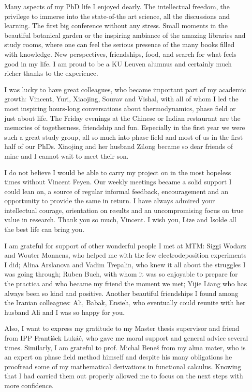 Many aspects of my PhD life I enjoyed dearly. The intellectual freedom, the privilege to immerse into the state-of-the art science, all the discussions and learning. The first big conference without any stress. Small moments in the beautiful botanical garden or the inspiring ambiance of the amazing libraries and study rooms, where one can feel the serious presence of the many books filled with knowledge. New perspectives, friendships, food, and search for what feels good in my life. I am proud to be a KU Leuven alumnus and certainly much richer thanks to the experience.

I was lucky to have great colleagues, who became important part of my academic growth: Vincent, Yuri, Xiaojing, Sourav and Vishal, with all of whom I led the most inspiring hours-long conversations about thermodynamics, phase field or just about life. The Friday evenings at the Chinese or Indian restaurant are the memories of togetherness, friendship and fun. Especially in the first year we were such a great study group, all so much into phase field and most of us in the first half of our PhDs. Xiaojing and her husband Zilong became so dear friends of mine and I cannot wait to meet their son.

I do not believe I would be able to carry my project on in the most hopeless times without Vincent Feyen. Our weekly meetings became a solid support I could lean on, a source of regular informal feedback, encouragement and an opportunity to provide the same in return. I have always admired your intellectual courage, orientation on results and an uncompromising focus on true value in research. Thank you so much, Vincent. I wish you, Lize and Isolde all the best life can bring you. 

I am grateful for support of other wonderful people I met at MTM: Siggi Wodarz and Wouter Monnens, who helped me with the few electrodeposition experiments I did; Alina Arslanova and Vadim Trepalin, who knew it all about the struggles I was going through; Ruben Buch, with whom it was so enjoyable to prepare for the practica and who became my friend the moment we met; Yijie Liang who has always been so kind and positive. Another beautiful friendships I found among the Iranian colleagues: Ali, Babak, Ensieh, who eventually could reunite with her husband Ali and I was so happy for you.

Also, I want to express my gratitude to my Master thesis supervisor and friend from IPP František Lukáč, who gave me moral support and general advice several times. Similarly, I am grateful to prof. Michal Beneš from my alma mater, who is an expert on phase field method himself and despite his many obligations he proofread some of my mathematical derivations in functional calculus. Knowing that I had carried them out properly allowed me to focus on the next steps with more confidence.

